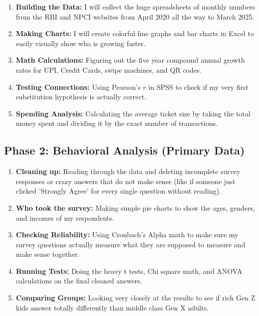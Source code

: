 \begin{enumerate}
    \item \textbf{Building the Data:} I will collect the huge spreadsheets of monthly numbers from the RBI and NPCI websites from April 2020 all the way to March 2025.
    \item \textbf{Making Charts:} I will create colorful line graphs and bar charts in Excel to easily visually show who is growing faster.
    \item \textbf{Math Calculations:} Figuring out the five year compound annual growth rates for UPI, Credit Cards, swipe machines, and QR codes.
    \item \textbf{Testing Connections:} Using Pearson's $r$ in SPSS to check if my very first substitution hypothesis is actually correct.
    \item \textbf{Spending Analysis:} Calculating the average ticket size by taking the total money spent and dividing it by the exact number of transactions.
\end{enumerate}

\subsection{Phase 2: Behavioral Analysis (Primary Data)}

\begin{enumerate}
    \item \textbf{Cleaning up:} Reading through the data and deleting incomplete survey responses or crazy answers that do not make sense (like if someone just clicked 'Strongly Agree' for every single question without reading).
    \item \textbf{Who took the survey:} Making simple pie charts to show the ages, genders, and incomes of my respondents.
    \item \textbf{Checking Reliability:} Using Cronbach's Alpha math to make sure my survey questions actually measure what they are supposed to measure and make sense together.
    \item \textbf{Running Tests:} Doing the heavy t tests, Chi square math, and ANOVA calculations on the final cleaned answers.
    \item \textbf{Comparing Groups:} Looking very closely at the results to see if rich Gen Z kids answer totally differently than middle class Gen X adults.
\end{enumerate}

